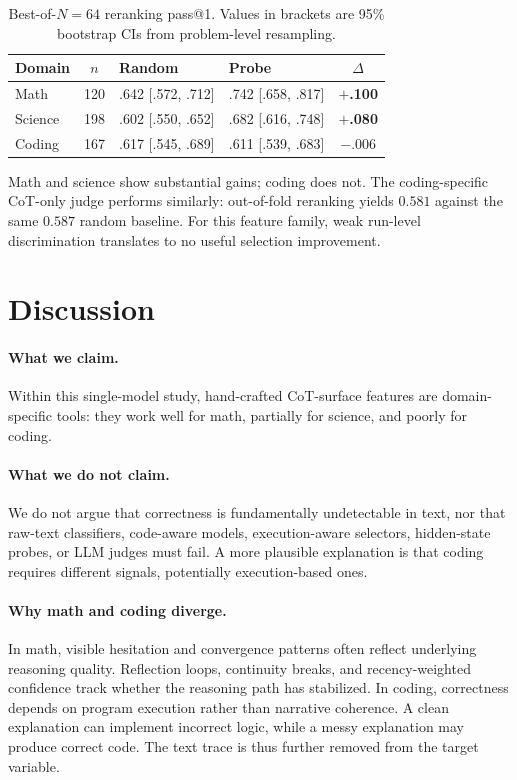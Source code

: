 \documentclass[10pt,twocolumn]{article}
\begin{document}
\begin{table}[t]
\centering
\footnotesize
\setlength{\tabcolsep}{3.5pt}
\begin{tabularx}{\columnwidth}{@{}l c Y Y c@{}}
\toprule
Domain & $n$ & Random & Probe & $\Delta$ \\
\midrule
Math    & 120 & .642 [.572, .712] & .742 [.658, .817] & \textbf{$+$.100} \\
Science & 198 & .602 [.550, .652] & .682 [.616, .748] & \textbf{$+$.080} \\
Coding  & 167 & .617 [.545, .689] & .611 [.539, .683] & $-$.006 \\
\bottomrule
\end{tabularx}
\caption{Best-of-$N=64$ reranking pass@1. Values in brackets are 95\% bootstrap CIs from problem-level resampling.}
\label{tab:reranking}
\end{table}

Math and science show substantial gains; coding does not. The coding-specific CoT-only judge performs similarly: out-of-fold reranking yields $0.581$ against the same $0.587$ random baseline. For this feature family, weak run-level discrimination translates to no useful selection improvement.

\section{Discussion}
\label{sec:why}

\paragraph{What we claim.}
Within this single-model study, hand-crafted CoT-surface features are domain-specific tools: they work well for math, partially for science, and poorly for coding.

\paragraph{What we do not claim.}
We do not argue that correctness is fundamentally undetectable in text, nor that raw-text classifiers, code-aware models, execution-aware selectors, hidden-state probes, or LLM judges must fail. A more plausible explanation is that coding requires different signals, potentially execution-based ones.

\paragraph{Why math and coding diverge.}
In math, visible hesitation and convergence patterns often reflect underlying reasoning quality. Reflection loops, continuity breaks, and recency-weighted confidence track whether the reasoning path has stabilized. In coding, correctness depends on program execution rather than narrative coherence. A clean explanation can implement incorrect logic, while a messy explanation may produce correct code. The text trace is thus further removed from the target variable.
\end{document}
